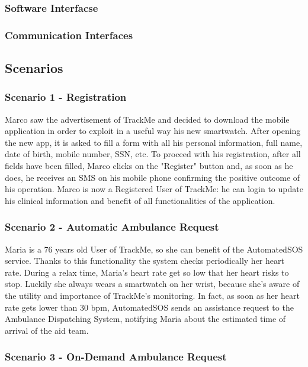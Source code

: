 \documentclass[12pt,a4paper]{article}
\begin{document}
			\subsubsection{Software Interfacse}
			\subsubsection{Communication Interfaces}
			
		\newpage
		\subsection{Scenarios}
			\subsubsection*{Scenario 1 - Registration}
				Marco saw the advertisement of TrackMe and decided to download the mobile application in order to exploit in a useful way his new smartwatch. After opening the new app, it is asked to fill a form with all his personal information, full name, date of birth, mobile number, SSN, etc. To proceed with his registration, after all fields have been filled, Marco clicks on the "Register" button and, as soon as he does, he receives an SMS on his mobile phone confirming the positive outcome of his operation. Marco is now a Registered User of TrackMe: he can login to update his clinical information and benefit of all functionalities of the application.
			\subsubsection*{Scenario 2 - Automatic Ambulance Request}
				Maria is a 76 years old User of TrackMe, so she can benefit of the AutomatedSOS service. Thanks to this functionality the system checks periodically her heart rate. During a relax time, Maria's heart rate get so low that her heart risks to stop. Luckily she always wears a smartwatch on her wrist, because she's aware of the utility and importance of TrackMe's monitoring. In fact, as soon as her heart rate gets lower than 30 bpm, AutomatedSOS sends an assistance request to the Ambulance Dispatching System, notifying Maria about the estimated time of arrival of the aid team.
			
			\subsubsection*{Scenario 3 - On-Demand Ambulance Request}
			
\end{document}
